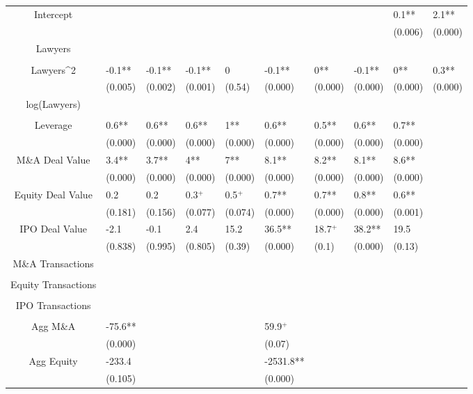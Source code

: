 \documentclass{article}
\begin{document}
\begin{table}[H]
\begin{tabular}{|clllllllll|}
Intercept &  &  &  &  &  &  &  & 0.1** & 2.1** \\ 
   &  &  &  &  &  &  &  & (0.006) & (0.000) \\ 
  Lawyers &  &  &  &  &  &  &  &  &  \\ 
   &  &  &  &  &  &  &  &  &  \\ 
  Lawyers^2 & -0.1** & -0.1** & -0.1** & 0 & -0.1** & 0** & -0.1** & 0** & 0.3** \\ 
   & (0.005) & (0.002) & (0.001) & (0.54) & (0.000) & (0.000) & (0.000) & (0.000) & (0.000) \\ 
  log(Lawyers) &  &  &  &  &  &  &  &  &  \\ 
   &  &  &  &  &  &  &  &  &  \\ 
  Leverage & 0.6** & 0.6** & 0.6** & 1** & 0.6** & 0.5** & 0.6** & 0.7** &  \\ 
   & (0.000) & (0.000) & (0.000) & (0.000) & (0.000) & (0.000) & (0.000) & (0.000) &  \\ 
  M\&A Deal Value & 3.4** & 3.7** & 4** & 7** & 8.1** & 8.2** & 8.1** & 8.6** &  \\ 
   & (0.000) & (0.000) & (0.000) & (0.000) & (0.000) & (0.000) & (0.000) & (0.000) &  \\ 
  Equity Deal Value & 0.2 & 0.2 & 0.3$^{+}$ & 0.5$^{+}$ & 0.7** & 0.7** & 0.8** & 0.6** &  \\ 
   & (0.181) & (0.156) & (0.077) & (0.074) & (0.000) & (0.000) & (0.000) & (0.001) &  \\ 
  IPO Deal Value & -2.1 & -0.1 & 2.4 & 15.2 & 36.5** & 18.7$^{+}$ & 38.2** & 19.5 &  \\ 
   & (0.838) & (0.995) & (0.805) & (0.39) & (0.000) & (0.1) & (0.000) & (0.13) &  \\ 
  M\&A Transactions &  &  &  &  &  &  &  &  &  \\ 
   &  &  &  &  &  &  &  &  &  \\ 
  Equity Transactions &  &  &  &  &  &  &  &  &  \\ 
   &  &  &  &  &  &  &  &  &  \\ 
  IPO Transactions &  &  &  &  &  &  &  &  &  \\ 
   &  &  &  &  &  &  &  &  &  \\ 
  Agg M\&A & -75.6** &  &  &  & 59.9$^{+}$ &  &  &  &  \\ 
   & (0.000) &  &  &  & (0.07) &  &  &  &  \\ 
  Agg Equity & -233.4 &  &  &  & -2531.8** &  &  &  &  \\ 
   & (0.105) &  &  &  & (0.000) &  &  &  &  \\ 

\end{tabular}
\end{table}
\end{document}
